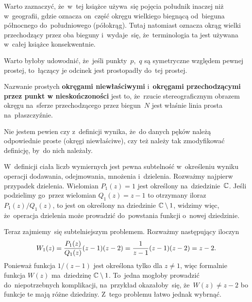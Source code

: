 \documentclass[a4paper,11pt]{article}
\begin{document}
\vspace{\spaceFour}


\start {} Warto zaznaczyć, że~w~tej książce używa~się pojęcia
południk inaczej niż w~geografii, gdzie oznacza on~część okręgu
wielkiego biegnącą od~bieguna północnego do~południowego (półokrąg).
Tutaj natomiast oznacza okrąg wielki przechodzący przez oba bieguny
i~wydaje~się, że~terminologia ta jest używana w~całej książce
konsekwentnie.

\vspace{\spaceFour}


\start {} Warto byłoby udowodnić, że~jeśli punkty~$p$,~$q$ są
symetryczne względem pewnej prostej, to~łączący je odcinek jest
prostopadły do~tej prostej.

\vspace{\spaceFour}


\start {} Nazwanie prostych \textbf{okręgami niewłaściwymi}
i~\textbf{okręgami przechodzącymi przez punkt w nieskończoności} jest
to, że~rzucie stereograficznym obrazem okręgu na~sferze przechodzącego
przez biegun~$N$ jest właśnie linia prosta na~płaszczyźnie.

\vspace{\spaceFour}


\start {} Nie jestem pewien czy z~definicji wynika, że~do danych
pęków należą odpowiednie proste (okręgi niewłaściwe), czy też należy
tak zmodyfikować definicję, by~do nich należały.

\vspace{\spaceFour}


\start {} W~definicji ciała liczb wymiernych jest pewna
subtelność w~określeniu wyniku operacji dodawania, odejmowania,
mnożenia i~dzielenia. Rozważmy najpierw przypadek dzielenia. Wielomian
$P_{ 1 }( z ) = 1$ jest określony na~dziedzinie~$\mathbb{C}$. Jeśli podzielimy
go~przez wielomian $Q_{ 1 }( z ) = z - 1$ to otrzymany iloraz
$P_{ 1 }( z ) / Q_{ 1 }( z )$, to jest on określony na dziedzinie
$\mathbb{C} \setminus 1$, widzimy więc, że~operacja dzielenia może prowadzić
do~powstania funkcji o~nowej dziedzinie.

Teraz zajmiemy~się subtelniejszym problemem. Rozważmy następujący
iloczyn
\begin{equation}
  \label{eq:Leja-33}
  \begin{split}
    W_{ 1 }( z ) = \frac{ P_{ 1 }( z ) }{ Q_{ 1 }( z ) } ( z - 1 ) ( z -
    2 ) = \frac{ 1 }{ z - 1 } ( z - 1 ) ( z - 2 ) = z - 2.
  \end{split}
\end{equation}
Ponieważ funkcja $1 / ( z - 1 )$ jest określona tylko dla $z \neq 1$,
więc formalnie funkcja $W( z )$ ma~dziedzinę $\mathbb{C} \setminus 1$.
To~jedna mogłoby prowadzić do~niepotrzebnych komplikacji, na~przykład
okazałoby~się, że~$W( z ) \neq z - 2$ bo funkcje te mają różne
dziedziny. Z~tego problemu łatwo jednak wybrnąć.
\end{document}
